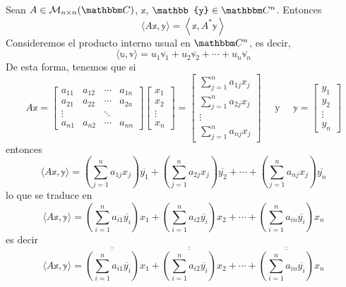 \begin{theorem}
    Sean $A \in \mathcal{M}_{n \times n}(\CC)$, $\mathbb{x}$, $\mathbb{y} \in \CC[n]$. Entonces
    $$\langle A\mathbb{x}, \mathbb{y} \rangle = \left\langle \mathbb{x}, A^*\mathbb{y} \right\rangle$$
    \demostracion Consideremos el producto interno usual en $\CC[n]$, es decir,
    $$\langle \mathbb{u}, \mathbb{v} \rangle = u_1 \overline{\mathbb{v}_1} + u_2 \overline{\mathbb{v}_2} + \cdots + u_n \overline{\mathbb{v}_n}$$
    De esta forma, tenemos que si
    $$A\mathbb{x} = \begin{bmatrix}
        a_{11} & a_{12} & \cdots & a_{1n} \\
        a_{21} & a_{22} & \cdots & a_{2n} \\
        \vdots &  & \ddots & \\
        a_{n1} & a_{n2} & \cdots & a_{nn}
    \end{bmatrix} \begin{bmatrix}
        x_1 \\
        x_2 \\
        \vdots \\
        x_n
    \end{bmatrix} = \begin{bmatrix}
        \displaystyle\sum_{j=1}^n a_{1j}x_j \\
        \displaystyle\sum_{j=1}^n a_{2j}x_j \\
        \vdots \\
        \displaystyle\sum_{j=1}^n a_{nj}x_j
    \end{bmatrix} \quad \text{ y } \quad \mathbb{y} = \begin{bmatrix}
        y_1 \\
        y_2 \\
        \vdots \\
        y_n
    \end{bmatrix}$$\newpage\noindent
    entonces
    $$\langle A\mathbb{x}, \mathbb{y} \rangle = \left( \sum_{j=1}^n a_{1j}x_j \right) \overline{y_1} + \left( \sum_{j=1}^n a_{2j}x_j \right) \overline{y_2} + \cdots + \left( \sum_{j=1}^n a_{nj}x_j \right) \overline{y_n}$$
    lo que se traduce en
    $$\langle A\mathbb{x}, \mathbb{y} \rangle = \left( \sum_{i=1}^n a_{i1} \overline{y_i} \right) x_1 + \left( \sum_{i=1}^n a_{i2} \overline{y_i} \right) x_2 + \cdots + \left( \sum_{i=1}^n a_{in} \overline{y_i} \right) x_n$$
    es decir
    $$\langle A\mathbb{x}, \mathbb{y} \rangle = \overline{\overline{\left( \sum_{i=1}^n a_{i1} \overline{y_i} \right)}} x_1 + \overline{\overline{\left( \sum_{i=1}^n a_{i2} \overline{y_i} \right)}} x_2 + \cdots + \overline{\overline{\left( \sum_{i=1}^n a_{in} \overline{y_i} \right)}} x_n$$

\end{theorem}
